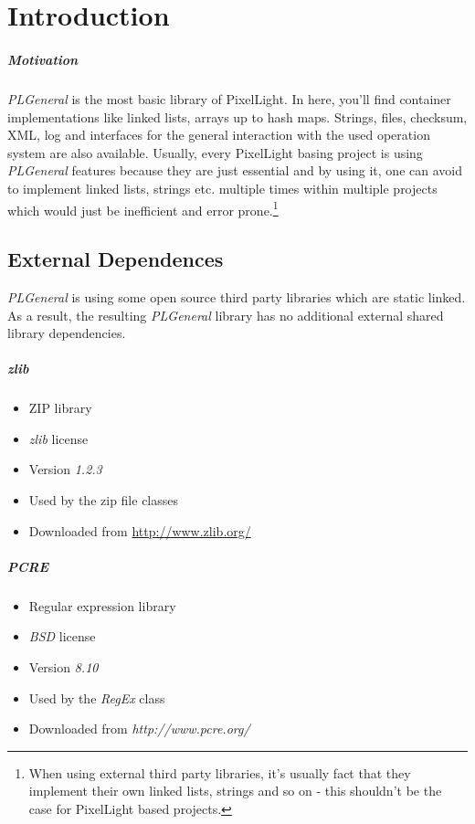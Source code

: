 \chapter{Introduction}


\paragraph{Motivation}
\emph{PLGeneral} is the most basic library of PixelLight. In here, you'll find container implementations like linked lists, arrays up to hash maps. Strings, files, checksum, XML, log and interfaces for the general interaction with the used operation system are also available. Usually, every PixelLight basing project is using \emph{PLGeneral} features because they are just essential and by using it, one can avoid to implement linked lists, strings etc. multiple times within multiple projects which would just be inefficient and error prone.\footnote{When using external third party libraries, it's usually fact that they implement their own linked lists, strings and so on - this shouldn't be the case for PixelLight based projects.}




\section{External Dependences}
\emph{PLGeneral} is using some open source third party libraries which are static linked. As a result, the resulting \emph{PLGeneral} library has no additional external shared library dependencies.


\paragraph{zlib}
\begin{itemize}
\item ZIP library
\item \emph{zlib} license
\item Version \emph{1.2.3}
\item Used by the zip file classes
\item Downloaded from \url{http://www.zlib.org/}
\end{itemize}


\paragraph{PCRE}
\begin{itemize}
\item Regular expression library
\item \emph{BSD} license
\item Version \emph{8.10}
\item Used by the \emph{RegEx} class
\item Downloaded from \emph{http://www.pcre.org/}
\end{itemize}


